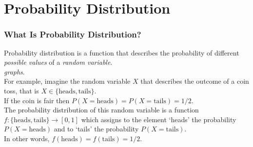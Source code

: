 \documentclass[aspectratio=169,11pt,usenames,dvipsnames,handout]{beamer}
\begin{document}
%
%
%

\section{Probability Distribution}

\begin{frame}
 \frametitle{What Is Probability Distribution?}
 \alert{Probability distribution} is a function that describes the probability
 of different \emph{possible values} of a \emph{random variable}.\\ \pause
 \emph{graphs}.\\ \pause
 For example, imagine the random variable $X$ that describes the outcome of a
 coin toss, that is $X \in \{\text{heads},\text{tails}\}$. \\ \pause
 If the coin is fair then $P(X = \text{heads}) = P(X = \text{tails}) = 1 / 2$.\\
 \pause
 The \alert{probability distribution} of this random variable is a function
 $f:\{\text{heads},\text{tails}\} \to [0,1]$ which assigns to the element
 `heads' the probability $P(X = \text{heads})$ and to `tails' the probability
 $P(X = \text{tails})$.\\ \pause
 In other words, $f(\text{heads}) = f(\text{tails}) = 1 / 2$.
\end{frame}
\end{document}

